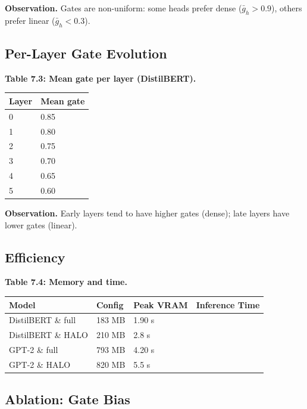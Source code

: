 \textbf{Observation.} Gates are non-uniform: some heads prefer dense 
($\bar{g}_h > 0.9$), others prefer linear ($\bar{g}_h < 0.3$).

\subsection{Per-Layer Gate Evolution}

\textbf{Table 7.3: Mean gate per layer (DistilBERT).}

\begin{table}[H]
\centering
\small
\begin{tabular}{ll}
\toprule
\textbf{Layer} & \textbf{Mean gate} \\
\midrule
0 & 0.85 \\
1 & 0.80 \\
2 & 0.75 \\
3 & 0.70 \\
4 & 0.65 \\
5 & 0.60 \\
\bottomrule
\end{tabular}
\end{table}

\textbf{Observation.} Early layers tend to have higher gates (dense); late 
layers have lower gates (linear).

\subsection{Efficiency}

\textbf{Table 7.4: Memory and time.}

\begin{table}[H]
\centering
\small
\begin{tabular}{llll}
\toprule
\textbf{Model} & \textbf{Config} & \textbf{Peak VRAM} & \textbf{Inference Time} \\
\midrule
DistilBERT \& full & 183 MB & 1.90 s \\
DistilBERT \& HALO & 210 MB & 2.8 s \\
GPT-2 \& full & 793 MB & 4.20 s \\
GPT-2 \& HALO & 820 MB & 5.5 s \\
\bottomrule
\end{tabular}
\end{table}

\subsection{Ablation: Gate Bias}

